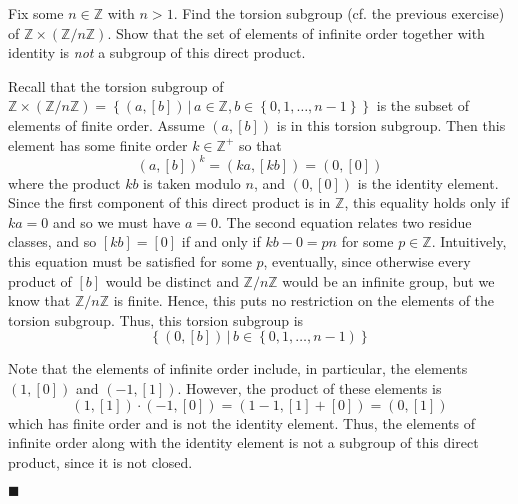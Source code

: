 \documentclass[12pt]{article}
\renewcommand{\qed}{\hfill$\blacksquare$}
\renewenvironment{proof}{\begin{addmargin}[1em]{0em}\begin{newproof}}{\end{newproof}\end{addmargin}\qed}
\newenvironment{problem}[2][Exercise]{\begin{trivlist}
\item[\hskip \labelsep {\bfseries #1}\hskip \labelsep {\bfseries #2.}]}{\end{trivlist}}
\begin{document}
\begin{problem}{2.1.7}
Fix some $n\in \mathbb{Z}$ with $n>1$. Find the torsion subgroup (cf. the previous exercise) of $\mathbb{Z}\times \left(\mathbb{Z}/n\mathbb{Z}\right)$. Show that the set of elements of infinite order together with identity is \textit{not} a subgroup of this direct product.
\end{problem}
\begin{proof}
Recall that the torsion subgroup of $\mathbb{Z}\times \left(\mathbb{Z}/n\mathbb{Z}\right) = \left\{ \left(a,\left[b\right]\right)\, | \, a \in \mathbb{Z}, b \in \left\{0,1,\ldots,n-1\right\} \right\}$ is the subset of elements of finite order. Assume $\left(a,\left[b\right]\right)$ is in this torsion subgroup. Then this element has some finite order $k\in \mathbb{Z}^+$ so that \[ \left(a,\left[b\right]\right)^k = \left(ka, \left[kb\right]\right) = \left(0,\left[0\right]\right) \] where the product $kb$ is taken modulo $n$, and $\left(0,\left[0\right]\right)$ is the identity element. Since the first component of this direct product is in $\mathbb{Z}$, this equality holds only if $ka=0$ and so we must have $a=0$. The second equation relates two residue classes, and so $\left[kb\right] = \left[0\right]$ if and only if $kb-0 = pn$ for some $p\in \mathbb{Z}$. Intuitively, this equation must be satisfied for some $p$, eventually, since otherwise every product of $\left[b\right]$ would be distinct and $\mathbb{Z}/n\mathbb{Z}$ would be an infinite group, but we know that $\mathbb{Z}/n\mathbb{Z}$ is finite. Hence, this puts no restriction on the elements of the torsion subgroup. Thus, this torsion subgroup is \[ \left\{ \left(0,\left[b\right]\right) \, | \, b\in \left\{0,1,\ldots,n-1\right)\right\} \]

Note that the elements of infinite order include, in particular, the elements $\left(1,\left[0\right]\right)$ and $\left(-1,\left[1\right]\right)$. However, the product of these elements is \[ \left(1,\left[1\right]\right)\cdot \left(-1,\left[0\right]\right) = \left(1-1,\left[1\right]+\left[0\right]\right) = \left(0,\left[1\right]\right) \] which has finite order and is not the identity element. Thus, the elements of infinite order along with the identity element is not a subgroup of this direct product, since it is not closed.
\end{proof}
\end{document}
